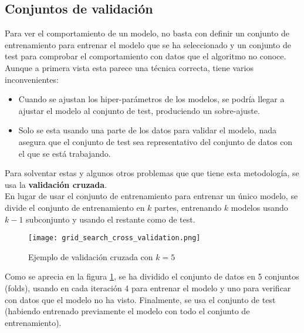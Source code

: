 \subsection{Conjuntos de validación}
\label{sec:validation}
Para ver el comportamiento de un modelo, no basta con definir un conjunto de entrenamiento para entrenar el modelo que se ha seleccionado y un conjunto de test para comprobar el comportamiento con datos que el algoritmo no conoce.  Aunque a primera vista esta parece una técnica correcta, tiene varios inconvenientes:
\begin{itemize}
	\item Cuando se ajustan los hiper-parámetros de los modelos,  se podría llegar a ajustar el modelo al conjunto de test, produciendo un sobre-ajuste.
	\item Solo se esta usando una parte de los datos para validar el modelo, nada asegura que el conjunto de test sea representativo del conjunto de datos con el que se está trabajando.
\end{itemize}
Para solventar estas y algunos otros problemas que que tiene esta metodología, se usa la \textbf{validación cruzada}.\\
\linebreak
En lugar de usar el conjunto de entrenamiento para entrenar un único modelo, se divide el conjunto de entrenamiento en $k$ partes, entrenando $k$ modelos usando $k-1$ subconjunto y usando el restante como de test. \\
\begin{figure}[H]
	\centering
	\texttt{[image: grid\_search\_cross\_validation.png]}
	\caption{Ejemplo de validación cruzada con $k=5$}
	\label{fig:cross-validation}
\end{figure}
Como se aprecia en la figura \ref{fig:cross-validation},  se ha dividido el conjunto de datos en 5 conjuntos (folds), usando en cada iteración 4 para entrenar el modelo y uno para verificar con datos que el modelo no ha visto. Finalmente, se usa el conjunto de test (habiendo entrenado previamente el modelo con todo el conjunto de entrenamiento).
